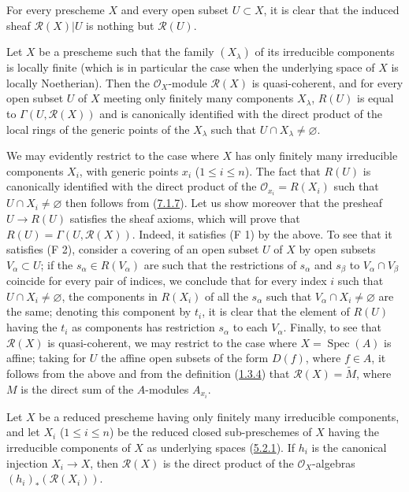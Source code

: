 For every prescheme $X$ and every open subset $U\subset X$, it is clear that the
induced sheaf $\mathscr{R}(X)|U$ is nothing but $\mathscr{R}(U)$.

\begin{proposition}[7.3.3]
\label{I.7.3.3}
Let $X$ be a prescheme such that the family $(X_\lambda)$ of its irreducible
components is locally finite (which is in particular the case when the
underlying space of $X$ is locally Noetherian). Then the
$\mathscr{O}_X$-module $\mathscr{R}(X)$ is quasi-coherent, and for every open
subset $U$ of $X$ meeting only finitely many components $X_\lambda$,
$R(U)$ is equal to $\Gamma(U,\mathscr{R}(X))$ and is canonically identified
with the direct product of the local rings of the generic points of the
$X_\lambda$ such that $U\cap X_\lambda\neq\varnothing$.
\end{proposition}

We may evidently restrict to the case where $X$ has only finitely many
irreducible components $X_i$, with generic points $x_i$
($1\leq i\leq n$). The fact that $R(U)$ is canonically identified with the
direct product of the $\mathscr{O}_{x_i}=R(X_i)$ such that
$U\cap X_i\neq\varnothing$ then follows from
(\hyperref[I.7.1.7]{7.1.7}). Let us show moreover that the presheaf
$U\to R(U)$ satisfies the sheaf axioms, which will prove that
$R(U)=\Gamma(U,\mathscr{R}(X))$. Indeed, it satisfies (F 1) by the above. To
see that it satisfies (F 2), consider a covering of an open subset $U$ of $X$
by open subsets $V_\alpha\subset U$; if the $s_\alpha\in R(V_\alpha)$ are such
that the restrictions of $s_\alpha$ and $s_\beta$ to $V_\alpha\cap V_\beta$
coincide for every pair of indices, we conclude that for every index $i$ such
that $U\cap X_i\neq\varnothing$, the components in $R(X_i)$ of all the
$s_\alpha$ such that $V_\alpha\cap X_i\neq\varnothing$ are the same; denoting
this component by $t_i$, it is clear that the element of $R(U)$ having the
$t_i$ as components has restriction $s_\alpha$ to each $V_\alpha$. Finally, to
see that $\mathscr{R}(X)$ is quasi-coherent, we may restrict to the case where
$X=\operatorname{Spec}(A)$ is affine; taking for $U$ the affine open subsets
of the form $D(f)$, where $f\in A$, it follows from the above and from the
definition (\hyperref[I.1.3.4]{1.3.4}) that
$\mathscr{R}(X)=\widetilde M$, where $M$ is the direct sum of the $A$-modules
$A_{x_i}$.

\begin{corollary}[7.3.4]
\label{I.7.3.4}
Let $X$ be a reduced prescheme having only finitely many irreducible
components, and let $X_i$ ($1\leq i\leq n$) be the reduced closed
sub-preschemes of $X$ having the irreducible components of $X$ as underlying
spaces \textup{(\hyperref[I.5.2.1]{5.2.1})}. If $h_i$ is the canonical injection
$X_i\to X$, then $\mathscr{R}(X)$ is the direct product of the
$\mathscr{O}_X$-algebras $(h_i)_*(\mathscr{R}(X_i))$.
\end{corollary}

